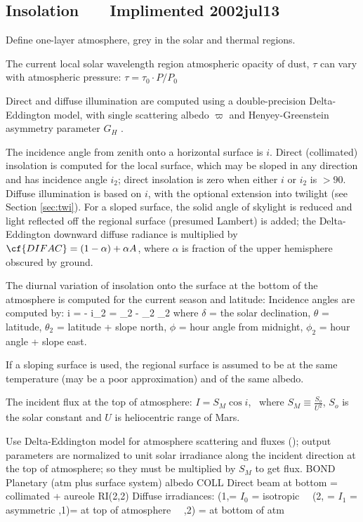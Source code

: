 
\subsection{Insolation \ \ \ Implimented 2002jul13} %
Define one-layer atmosphere, grey in the solar and thermal regions.

The current local solar wavelength region atmospheric opacity of dust, $\tau$
can vary with atmospheric pressure: $\tau = \tau_0 \cdot P/P_0$

Direct and diffuse illumination are computed using a double-precision
Delta-Eddington model, with single scattering albedo $\varpi$ and
Henyey-Greenstein asymmetry parameter $G_H$ .

The incidence angle from zenith onto a horizontal surface is $i$. Direct
(collimated) insolation is computed for the local surface, which may be sloped
in any direction and has incidence angle $i_2$; direct insolation is zero when
either $i$ or $i_2$ is $>90$\qd.  Diffuse illumination is based on $i$, with the
optional extension into twilight (see Section \ref{sec:twi}). For a sloped
surface, the solid angle of skylight is reduced and light reflected off the
regional surface (presumed Lambert) is added; the Delta-Eddington downward
diffuse radiance is multiplied by $\cf{DIFAC}=(1-\alpha) + \alpha A $, where
$\alpha$ is fraction of the upper hemisphere obscured by ground.

The diurnal variation of insolation onto the surface at the bottom of the
atmosphere is computed for the current season and latitude: 
Incidence angles are computed by:
\qbn \cos i = \sin \delta \sin \theta - \cos \delta \cos \theta \cos \phi \qen
\qbn \cos i_2 = \sin \delta \sin \theta_2 - \cos \delta \cos \theta_2 \cos \phi_2 \qen
where $\delta$ = the solar declination, $\theta$ = latitude, 
$\theta_2$ = latitude + slope north, $\phi$ = hour angle from midnight, 
$\phi_2$ = hour angle + slope east.

If a sloping surface is used, the regional surface is assumed to be at the same
temperature (may be a poor approximation) and of the same albedo.

The incident flux at the top of atmosphere: $ I = S_M  \cos i$, \  
where  $S_M \equiv \frac{S_o}{U^2} $, $S_o$ is the solar constant and $U$ is
heliocentric range of Mars.

Use Delta-Eddington model for atmosphere scattering and fluxes ();
output parameters are normalized to unit solar irradiance along the incident
direction at the top of atmosphere; so they must be multiplied by $S_M$ to get flux.
\qi  BOND      Planetary (atm plus surface system) albedo
\qi  COLL   Direct beam at bottom = collimated + aureole
\qi  RI(2,2)   Diffuse irradiances: 
\qii             (1,=  $I_0$ = isotropic  \ \  (2, =  $I_1$ = asymmetric
\qii             ,1)= at top of atmosphere  \ \  ,2) = at bottom of atm

